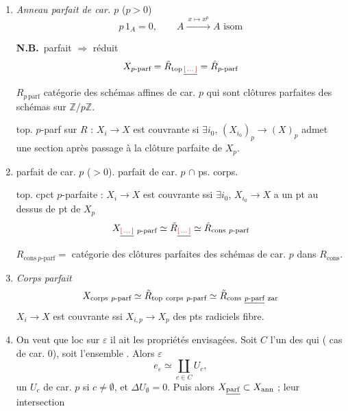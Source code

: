 \documentclass[11pt,a4paper]{article}
\begin{document}
\begin{enumerate}
  \item[17)] \emph{Anneau parfait de car. $p$} ($p > 0$)
    \[
      p\,1_{A} = 0, \qquad A \xrightarrow{\ x \mapsto x^{p}\ } A \text{ isom}
    \]

    \textbf{N.B.}\ parfait $\Longrightarrow$ réduit
    \[
      X_{p\text{-parf}} = \tilde{R}_{\mathrm{top}\,\struck{\ill{}}}
      = \hat{R}_{p\text{-parf}}
    \]
    $R_{p\,\mathrm{parf}}$ catégorie des schémas affines  de
    car. $p$ qui sont clôtures parfaites des schémas  sur
    $\mathbb{Z}/p\mathbb{Z}$.

    top. $p$-parf sur $R$ : $X_{i} \to X$ est couvrante si $\exists i_{0}$,
    $(X_{i_{0}})_{p} \to (X)_{p}$ admet une section après passage à la
    clôture parfaite de $X_{p}$.
  \item[18)]   parfait de car. $p$
    ($> 0$). parfait de car. $p$ $\cap$ ps. corps.

    top. cpct $p$-parfaite : $X_{i} \to X$ est couvrante ssi $\exists i_{0}$,
    $X_{i_{0}} \to X$ a un pt  au dessus de \ill{} pt de
    $X_{p}$
    \[
      X_{\struck{\ill{}}\ p\text{-parf}} \simeq
      \tilde{R}_{\struck{\ill{}}} \simeq \hat{R}_{\mathrm{cons}\ p\text{-parf}}
    \]
    $R_{\mathrm{cons}\ p\text{-parf}} =$ catégorie des clôtures parfaites des
    schémas de car. $p$ dans $R_{\mathrm{cons}}$.
  \item[19)] \emph{Corps parfait} \struck{\ill{}} 
    \[
      X_{\mathrm{corps}\ p\text{-parf}} \simeq
      \tilde{R}_{\mathrm{top\ corps}\ p\text{-parf}} \simeq
      \tilde{R}_{\mathrm{cons}\ \uncertain{p\text{-parf}}\ \mathrm{zar}}
    \]
    $X_{i} \to X$ est couvrante ssi $X_{i,p} \to X_{p}$  des pts
    radiciels \ill{}  fibre.
  \item[20)]  

     On veut que loc sur $\varepsilon$ il ait les propriétés
    envisagées. Soit $C$ l'un des \ill{} qui \ill{} \ill{} \ill{}
    ( cas de car. $0$),  soit \ill{} l'ensemble
    \ill{}. Alors $\varepsilon$ \ill{} \ill{} \ill{} \ill{} \ill{}
    \[
      e_{\varepsilon} \simeq \coprod_{c \in C} U_{c},
    \]
    un $U_{c}$ de car. $p$ si $c \neq \emptyset$, et $\Delta U_{\emptyset} = 0$.
    Puis alors $X_{\uncertain{\mathrm{parf}}} \subset X_{\mathrm{ann}}$ ; leur
    intersection \ill{} \ill{}
\end{enumerate}
\end{document}
